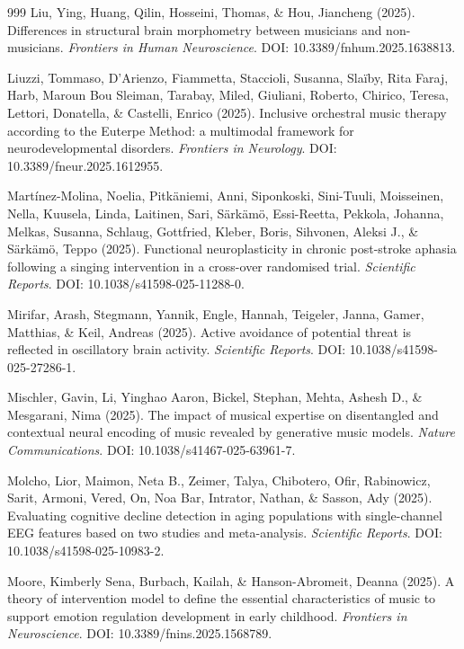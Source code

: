 \documentclass[9pt,onecolumn]{article}
\begin{document}
\begin{thebibliography}{999}
Liu, Ying, Huang, Qilin, Hosseini, Thomas, \& Hou, Jiancheng (2025). Differences in structural brain morphometry between musicians and non-musicians. \textit{Frontiers in Human Neuroscience}. DOI: 10.3389/fnhum.2025.1638813.

Liuzzi, Tommaso, D'Arienzo, Fiammetta, Staccioli, Susanna, Slaïby, Rita Faraj, Harb, Maroun Bou Sleiman, Tarabay, Miled, Giuliani, Roberto, Chirico, Teresa, Lettori, Donatella, \& Castelli, Enrico (2025). Inclusive orchestral music therapy according to the Euterpe Method: a multimodal framework for neurodevelopmental disorders. \textit{Frontiers in Neurology}. DOI: 10.3389/fneur.2025.1612955.

Martínez-Molina, Noelia, Pitkäniemi, Anni, Siponkoski, Sini-Tuuli, Moisseinen, Nella, Kuusela, Linda, Laitinen, Sari, Särkämö, Essi-Reetta, Pekkola, Johanna, Melkas, Susanna, Schlaug, Gottfried, Kleber, Boris, Sihvonen, Aleksi J., \& Särkämö, Teppo (2025). Functional neuroplasticity in chronic post-stroke aphasia following a singing intervention in a cross-over randomised trial. \textit{Scientific Reports}. DOI: 10.1038/s41598-025-11288-0.

Mirifar, Arash, Stegmann, Yannik, Engle, Hannah, Teigeler, Janna, Gamer, Matthias, \& Keil, Andreas (2025). Active avoidance of potential threat is reflected in oscillatory brain activity. \textit{Scientific Reports}. DOI: 10.1038/s41598-025-27286-1.

Mischler, Gavin, Li, Yinghao Aaron, Bickel, Stephan, Mehta, Ashesh D., \& Mesgarani, Nima (2025). The impact of musical expertise on disentangled and contextual neural encoding of music revealed by generative music models. \textit{Nature Communications}. DOI: 10.1038/s41467-025-63961-7.

Molcho, Lior, Maimon, Neta B., Zeimer, Talya, Chibotero, Ofir, Rabinowicz, Sarit, Armoni, Vered, On, Noa Bar, Intrator, Nathan, \& Sasson, Ady (2025). Evaluating cognitive decline detection in aging populations with single-channel EEG features based on two studies and meta-analysis. \textit{Scientific Reports}. DOI: 10.1038/s41598-025-10983-2.

Moore, Kimberly Sena, Burbach, Kailah, \& Hanson-Abromeit, Deanna (2025). A theory of intervention model to define the essential characteristics of music to support emotion regulation development in early childhood. \textit{Frontiers in Neuroscience}. DOI: 10.3389/fnins.2025.1568789.


\end{thebibliography}
\end{document}
